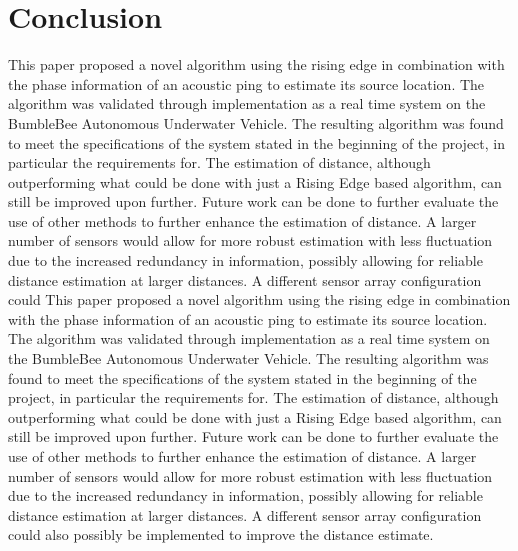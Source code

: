 \documentclass[a4paper]{IEEEtran}
\begin{document}
\section{Conclusion}

This paper proposed a novel algorithm using the rising edge in combination with the phase information of an acoustic ping to estimate its source location. The algorithm was validated through implementation as a real time system on the BumbleBee Autonomous Underwater Vehicle. 
The resulting algorithm was found to meet the specifications of the system stated in the beginning of the project, in particular the requirements for. The estimation of distance, although outperforming what could be done with just a Rising Edge based algorithm, can still be improved upon further. 
Future work can be done to further evaluate the use of other methods to further enhance the estimation of distance. A larger number of sensors would allow for more robust estimation with less fluctuation due to the increased redundancy in information, possibly allowing for reliable distance estimation at larger distances. A different sensor array configuration could This paper proposed a novel algorithm using the rising edge in combination with the phase information of an acoustic ping to estimate its source location. The algorithm was validated through implementation as a real time system on the BumbleBee Autonomous Underwater Vehicle. 
The resulting algorithm was found to meet the specifications of the system stated in the beginning of the project, in particular the requirements for. The estimation of distance, although outperforming what could be done with just a Rising Edge based algorithm, can still be improved upon further. 
Future work can be done to further evaluate the use of other methods to further enhance the estimation of distance. A larger number of sensors would allow for more robust estimation with less fluctuation due to the increased redundancy in information, possibly allowing for reliable distance estimation at larger distances. A different sensor array configuration could also possibly be implemented to improve the distance estimate. 


\end{document}
